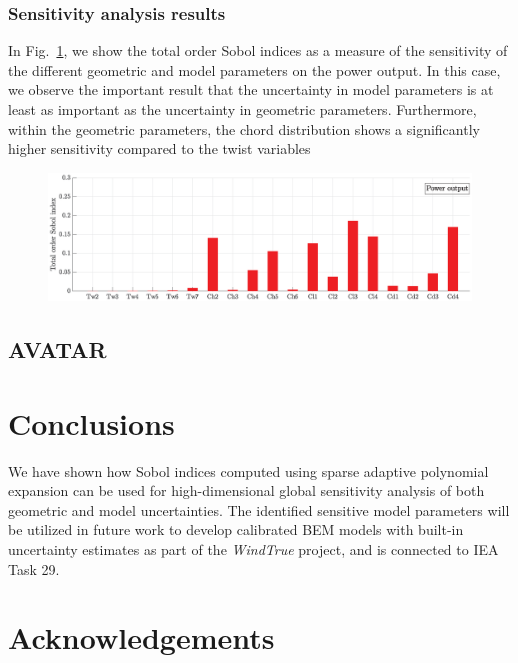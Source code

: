 \documentclass[review]{elsarticle}
\numberwithin{equation}{section}
\newcommand{\myreferences}{../references,../Mendeley_refs}
\numberwithin{equation}{section}
\begin{document}
\subsubsection{Sensitivity analysis results}
In Fig.~\ref{sensitivity_analysis}, we show the total order Sobol indices as a measure of the sensitivity of the different geometric and model parameters on the power output. In this case, we observe the important result that the uncertainty in model parameters is at least as important as the uncertainty in geometric parameters. Furthermore, within the geometric parameters, the chord distribution shows a significantly higher sensitivity compared to the twist variables

\begin{figure}[h!]
\centering
\includegraphics[trim={1cm 0cm 0 0cm},clip, scale=0.4]{SA_Power_chord_twist_Cl_Cd.eps}
\caption{}
\label{sensitivity_analysis}
\end{figure}

\subsection{AVATAR}

\section{Conclusions}\label{sec:conclusions}
We have shown how Sobol indices computed using sparse adaptive polynomial expansion can be used for high-dimensional global sensitivity analysis of both geometric and model uncertainties. The identified sensitive model parameters will be utilized in future work to develop calibrated BEM models with built-in uncertainty estimates as part of the \textit{WindTrue} project, and is connected to IEA Task 29.
\section*{Acknowledgements}

\newpage


\newpage

\appendix

\end{document}
